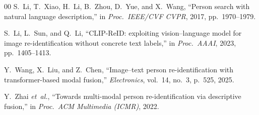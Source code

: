 ﻿\documentclass[conference]{IEEEtran}
\theoremstyle{definition}
\begin{document}
\begin{thebibliography}{00}
 S.~Li, T.~Xiao, H.~Li, B.~Zhou, D.~Yue, and X.~Wang, ``Person search with natural language description,'' in \emph{Proc.\ IEEE/CVF CVPR}, 2017, pp.~1970--1979.

 S.~Li, L.~Sun, and Q.~Li, ``CLIP-ReID: exploiting vision--language model for image re-identification without concrete text labels,'' in \emph{Proc.\ AAAI}, 2023, pp.~1405--1413.

 Y.~Wang, X.~Liu, and Z.~Chen, ``Image--text person re-identification with transformer-based modal fusion,'' \emph{Electronics}, vol.~14, no.~3, p.~525, 2025.

 Y.~Zhai \emph{et~al.}, ``Towards multi-modal person re-identification via descriptive fusion,'' in \emph{Proc.\ ACM Multimedia (ICMR)}, 2022.

\end{thebibliography}
\end{document}
